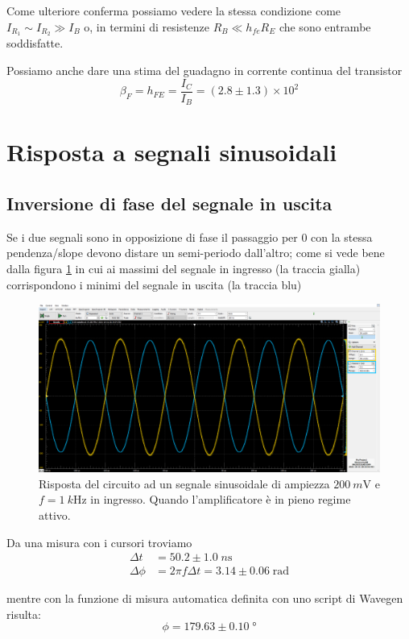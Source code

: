 \documentclass[10pt,a4paper]{article}
\begin{document}
Come ulteriore conferma possiamo vedere la stessa condizione come 
$I_{R_1} \sim I_{R_2} \gg I_{B}$ o, in termini di resistenze
$R_B \ll h_{fe} R_E$ che sono entrambe soddisfatte.

Possiamo anche dare una stima del guadagno in corrente continua del transistor
\[
\beta_F = h_{FE} = \frac{I_C}{I_B} = (2.8 \pm 1.3) \times 10^{2}  
\]

\section{Risposta a segnali sinusoidali}

\subsection{Inversione di fase del segnale in uscita}
Se i due segnali sono in opposizione di fase il passaggio per 0 con la stessa
pendenza/slope devono distare un semi-periodo dall'altro; come si vede bene
dalla figura \ref{fig: Alin} in cui ai massimi del segnale in ingresso (la
traccia gialla) corrispondono i minimi del segnale in uscita (la traccia blu)
\begin{figure}[htb]
\centering
\includegraphics[scale=0.335]{Alin200mV}
\caption{Risposta del circuito ad un segnale sinusoidale di ampiezza
$\SI{200}{m\V}$ e $f = \SI{1}{k\Hz}$ in ingresso. Quando l'amplificatore
è in pieno regime attivo. \label{fig: Alin}}
\end{figure}

Da una misura con i cursori troviamo
\begin{align*}
\Delta t &= 50.2 \pm 1.0 \; \si{n\s}\\
\Delta \phi &= 2\pi f \Delta t = 3.14 \pm 0.06 \; \si{\radian}
\end{align*}

mentre con la funzione di misura automatica definita con uno script di Wavegen
risulta:
\[
\phi = 179.63 \pm 0.10 \; \si{\degree}
\]
\end{document}
